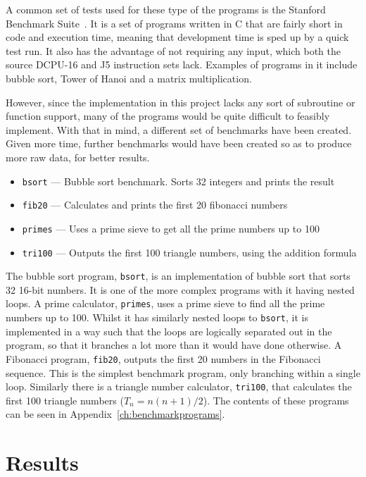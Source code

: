 A common set of tests used for these type of the programs is the Stanford
Benchmark Suite~\cite{stanford}. It is a set of programs written in C that are
fairly short in code and execution time, meaning that development time is sped
up by a quick test run. It also has the advantage of not requiring any input,
which both the source DCPU-16 and J5 instruction sets lack. Examples of
programs in it include bubble sort, Tower of Hanoi and a matrix multiplication.

However, since the implementation in this project lacks any sort of subroutine
or function support, many of the programs would be quite difficult to feasibly
implement. With that in mind, a different set of benchmarks have been created.
Given more time, further benchmarks would have been created so as to produce
more raw data, for better results.

\begin{itemize}[noitemsep]
  \item \texttt{bsort} --- Bubble sort benchmark. Sorts 32 integers and prints
  the result
  \item \texttt{fib20} --- Calculates and prints the first 20 fibonacci numbers
  \item \texttt{primes} --- Uses a prime sieve to get all the prime numbers up
  to 100
  \item \texttt{tri100} --- Outputs the first 100 triangle numbers, using the
    addition formula
\end{itemize}

The bubble sort program, \texttt{bsort}, is an implementation of bubble sort
that sorts 32 16-bit numbers. It is one of the more complex programs with it
having nested loops. A prime calculator, \texttt{primes}, uses a prime sieve to
find all the prime numbers up to 100. Whilst it has similarly nested loops to
\texttt{bsort}, it is implemented in a way such that the loops are logically
separated out in the program, so that it branches a lot more than it would have
done otherwise. A Fibonacci program, \texttt{fib20}, outputs the first 20
numbers in the Fibonacci sequence. This is the simplest benchmark program, only
branching within a single loop. Similarly there is a triangle number calculator,
\texttt{tri100}, that calculates the first 100 triangle numbers
($T_{n} = n(n+1)/2$). The contents of these programs can be seen in
Appendix~\ref{ch:benchmarkprograms}.

\section{Results}

